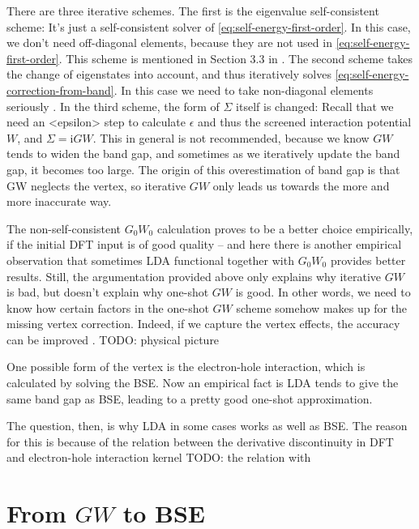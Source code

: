 \documentclass[hyperref, a4paper]{report}
\newcommand*{\ii}{\mathrm{i}}
\def\texttt#1{<#1>}%
\newcommand{\shortcode}[1]{\texttt{#1}}
\begin{document}
There are three iterative schemes.
The first is the eigenvalue self-consistent scheme:
It's just a self-consistent solver of \eqref{eq:self-energy-first-order}.
In this case, we don't need off-diagonal elements,
because they are not used in \eqref{eq:self-energy-first-order}.
This scheme is mentioned in Section 3.3 in \cite{berkeleygw}.
The second scheme takes the change of eigenstates into account,
and thus iteratively solves \eqref{eq:self-energy-correction-from-band}.
In this case we need to take non-diagonal elements seriously \cite{faleev2004all,aguilera2013g}.
In the third scheme, the form of $\Sigma$ itself is changed:
Recall that we need an \shortcode{epsilon} step to calculate $\epsilon$ 
and thus the screened interaction potential $W$, 
and $\Sigma = \ii G W$. 
This in general is not recommended,
because we know $GW$ tends to widen the band gap,
and sometimes as we iteratively update the band gap,
it becomes too large.
The origin of this overestimation of band gap is 
that GW neglects the vertex,
so iterative $GW$ only leads us towards the more and more inaccurate way. 

The non-self-consistent $G_0 W_0$ calculation proves to be a better choice empirically,
if the initial DFT input is of good quality -- 
and here there is another empirical observation that 
sometimes LDA functional together with $G_0 W_0$ provides better results.
Still, the argumentation provided above only explains why iterative $GW$ is bad, 
but doesn't explain why one-shot $GW$ is good. 
In other words, we need to know how certain factors 
in the one-shot $GW$ scheme somehow makes up for 
the missing vertex correction.
Indeed, if we capture the vertex effects, 
the accuracy can be improved 
\cite{PhysRevLett.99.246403}.
TODO: physical picture

One possible form of the vertex is the electron-hole interaction, which is calculated by solving the BSE. 
Now an empirical fact is  
LDA tends to give the same band gap as BSE, 
leading to a pretty good one-shot approximation. 

The question, then, is why LDA in some cases works as well as BSE.
The reason for this is because of the relation between the derivative discontinuity in DFT and electron-hole interaction kernel
TODO: the relation with \cite{perdew1982density}

\section{From $GW$ to BSE}
\end{document}
